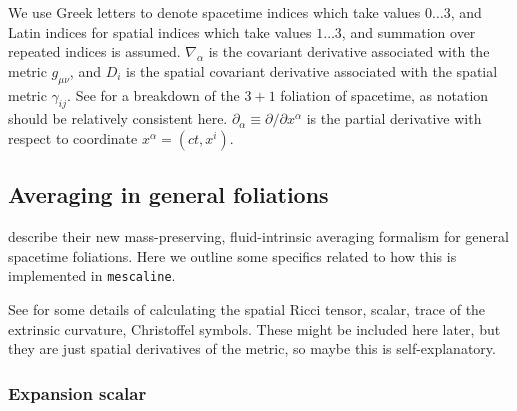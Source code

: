 \documentclass[a4paper]{article}
\newcommand{\alp}{\alpha}
\newcommand{\gam}{\gamma}
\newcommand{\pd}{\partial}
\begin{document}
We use Greek letters to denote spacetime indices which take values $0\ldots 3$, and Latin indices for spatial indices which take values $1\ldots 3$, and summation over repeated indices is assumed. $\nabla_\alp$ is the covariant derivative associated with the metric $g_{\mu\nu}$, and $D_i$ is the spatial covariant derivative associated with the spatial metric $\gam_{ij}$. See \citet{macpherson2019c} for a breakdown of the $3+1$ foliation of spacetime, as notation should be relatively consistent here. $\pd_\alp \equiv \pd / \pd x^\alp $ is the partial derivative with respect to coordinate $x^\alp=(ct,x^i)$.


\subsection{Averaging in general foliations}


\citet{buchert2018b,buchert2019} describe their new mass-preserving, fluid-intrinsic averaging formalism for general spacetime foliations. Here we outline some specifics related to how this is implemented in \texttt{mescaline}.



See \citet{macpherson2019c} for some details of calculating the spatial Ricci tensor, scalar, trace of the extrinsic curvature, Christoffel symbols. These might be included here later, but they are just spatial derivatives of the metric, so maybe this is self-explanatory. 

\subsubsection{Expansion scalar}
\end{document}
